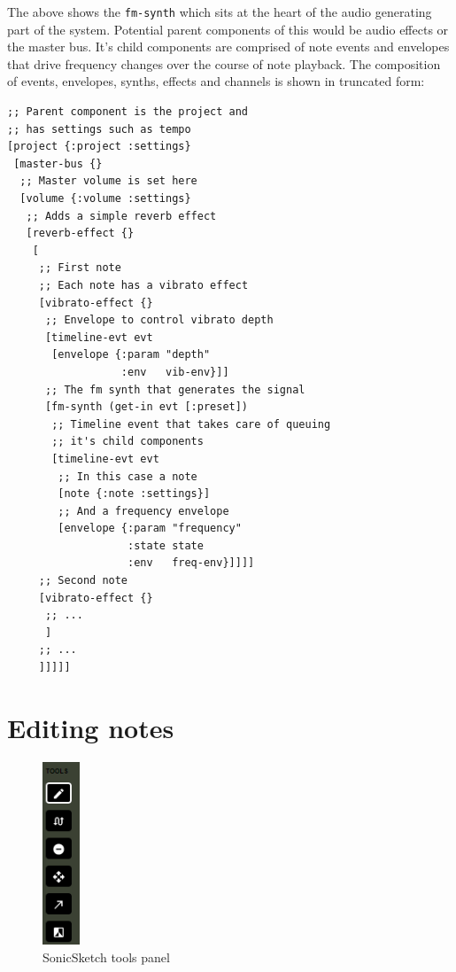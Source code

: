 \documentclass[12pt]{report}
\begin{document}
The above shows the \texttt{fm-synth} which sits at the heart of the audio generating
part of the system. Potential parent components of this would be audio effects
or the master bus. It's child components are comprised of note events and
envelopes that drive frequency changes over the course of note playback. The
composition of events, envelopes, synths, effects and channels is shown in
truncated form:
\begin{footnotesize}
\begin{verbatim}
;; Parent component is the project and
;; has settings such as tempo
[project {:project :settings}
 [master-bus {}
  ;; Master volume is set here
  [volume {:volume :settings}
   ;; Adds a simple reverb effect
   [reverb-effect {}
    [
     ;; First note
     ;; Each note has a vibrato effect
     [vibrato-effect {}
      ;; Envelope to control vibrato depth
      [timeline-evt evt
       [envelope {:param "depth"
                  :env   vib-env}]]
      ;; The fm synth that generates the signal
      [fm-synth (get-in evt [:preset])
       ;; Timeline event that takes care of queuing
       ;; it's child components
       [timeline-evt evt
        ;; In this case a note
        [note {:note :settings}]
        ;; And a frequency envelope
        [envelope {:param "frequency"
                   :state state
                   :env   freq-env}]]]]
     ;; Second note
     [vibrato-effect {}
      ;; ...
      ]
     ;; ...
     ]]]]]
\end{verbatim}
\end{footnotesize}

\section{Editing notes}
\label{sec:org4b16edc}
\begin{footnotesize}
\begin{LATEX}
\begin{figure}[h]
\centering
\includegraphics[width=0.1\textwidth]{./assets/tools-panel.png}
\caption{SonicSketch tools panel}
\label{fig:sonicsketch-tools-panel}
\end{figure}
\label{orgee2873b}
\end{LATEX}
\end{footnotesize}
\end{document}
